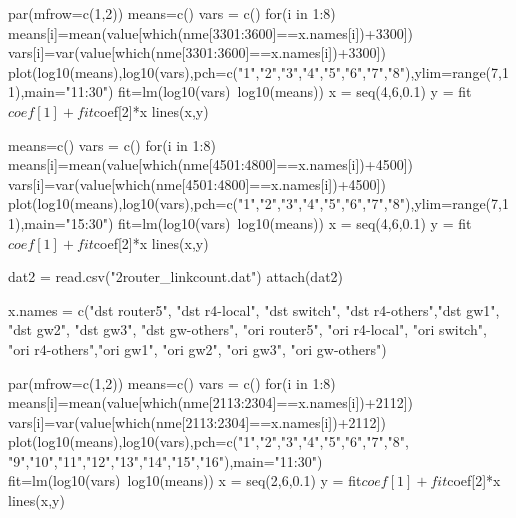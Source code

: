 \documentclass[letterpaper,10pt]{amsart}
\newenvironment{verbatimcode}{\bigskip \scriptsize \verbatim}{\endverbatim \normalsize \bigskip}
\begin{document}
\begin{enumerate}[{1}.1]
\begin{verbatimcode}
par(mfrow=c(1,2))
means=c()
vars = c()
for(i in 1:8)
{
  means[i]=mean(value[which(nme[3301:3600]==x.names[i])+3300])
  vars[i]=var(value[which(nme[3301:3600]==x.names[i])+3300])
}
plot(log10(means),log10(vars),pch=c("1","2","3","4","5","6","7","8"),ylim=range(7,11),main="11:30")
fit=lm(log10(vars)~log10(means))
x = seq(4,6,0.1)
y = fit$coef[1] + fit$coef[2]*x
lines(x,y)

means=c()
vars = c()
for(i in 1:8)
{
  means[i]=mean(value[which(nme[4501:4800]==x.names[i])+4500])
  vars[i]=var(value[which(nme[4501:4800]==x.names[i])+4500])
}
plot(log10(means),log10(vars),pch=c("1","2","3","4","5","6","7","8"),ylim=range(7,11),main="15:30")
fit=lm(log10(vars)~log10(means))
x = seq(4,6,0.1)
y = fit$coef[1] + fit$coef[2]*x
lines(x,y)


dat2 = read.csv("2router_linkcount.dat")
attach(dat2)

x.names = c("dst router5", "dst r4-local", "dst switch", "dst r4-others","dst gw1", "dst gw2", "dst gw3", "dst gw-others", 
              "ori router5", "ori r4-local", "ori switch", "ori r4-others","ori gw1", "ori gw2", "ori gw3", "ori gw-others")

par(mfrow=c(1,2))
means=c()
vars = c()
for(i in 1:8)
{
  means[i]=mean(value[which(nme[2113:2304]==x.names[i])+2112])
  vars[i]=var(value[which(nme[2113:2304]==x.names[i])+2112])
}
plot(log10(means),log10(vars),pch=c("1","2","3","4","5","6","7","8",
                                    "9","10","11","12","13","14","15","16"),main="11:30")
fit=lm(log10(vars)~log10(means))
x = seq(2,6,0.1)
y = fit$coef[1] + fit$coef[2]*x
lines(x,y)


\end{verbatimcode}
\end{enumerate}
\end{document}
